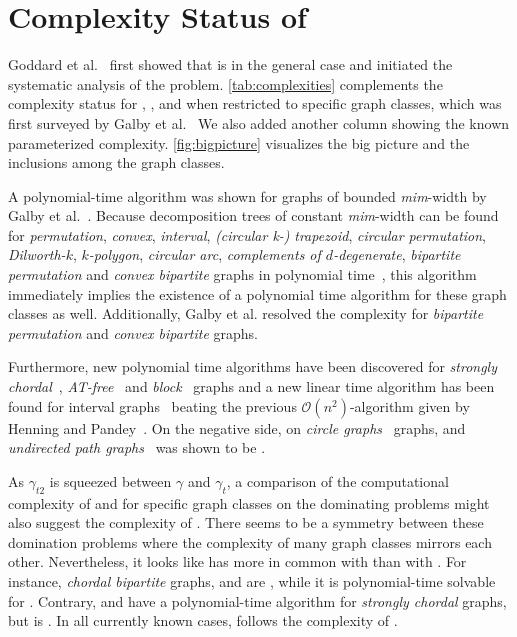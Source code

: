 \section{Complexity Status of \sdom}\label{ch:complexity-status}

Goddard et al.~\cite{Goddard2014} first showed that \SDOM is \NPc in the general case and initiated the systematic analysis of the problem.  
\cref{tab:complexities} complements the complexity status for \doms, \sdoms, and \tdoms when restricted to specific graph classes, which was first surveyed by Galby et al.~\cite{Galby2020}
We also added another column showing the known parameterized complexity. 
\cref{fig:bigpicture} visualizes the big picture and the inclusions among the graph classes.

A polynomial-time algorithm was shown for graphs of bounded \textit{mim}-width by Galby et al.~\cite{Galby2020}.
Because decomposition trees of constant \textit{mim}-width can be found for \textit{permutation}, \textit{convex}, \textit{interval}, \textit{(circular k-)} \textit{trapezoid}, \textit{circular permutation}, \textit{Dilworth-$k$}, \textit{$k$-polygon}, \textit{circular arc}, \textit{complements of $d$-degenerate}, \textit{bipartite permutation} and \textit{convex bipartite} graphs in polynomial time~\cite{Belmonte2011}, this algorithm immediately implies the existence of a polynomial time algorithm for these graph classes as well. 
Additionally, Galby et al. resolved the complexity for \textit{bipartite permutation} and \textit{convex bipartite} graphs.

Furthermore, new polynomial time algorithms have been discovered for \textit{strongly chordal}~\cite{Tripathi2021}, \textit{AT-free}~\cite{Kloks2021} and \textit{block}~\cite{Henning2022} graphs and a new linear time algorithm has been found for interval graphs~\cite{Pradhan2021} beating the previous $\mathcal{O}(n^2)$-algorithm given by Henning and Pandey~\cite{Henning2019}.
On the negative side, \sdom on \textit{circle graphs}~\cite{Kloks2021} graphs, and \textit{undirected path graphs}~\cite{Henning2019} was shown to be \NPc.

As $\gamma_{t2}$ is squeezed between $\gamma$ and $\gamma_t$, a comparison of the computational complexity of \sdom and \tdom for specific graph classes on the dominating problems might also suggest the complexity of \sdoms.
There seems to be a symmetry between these domination problems where the complexity of many graph classes mirrors each other.
Nevertheless, it looks like \sdoms has more in common with \doms than with \tdoms.
For instance, \textit{chordal bipartite} graphs, \sdoms and \doms are \NPc, while it is polynomial-time solvable for \tdoms. 
Contrary, \sdoms and \doms have a polynomial-time algorithm for \textit{strongly chordal} graphs, but \tdoms is \NPc.
In all currently known cases, \sdom follows the complexity of \dom.

